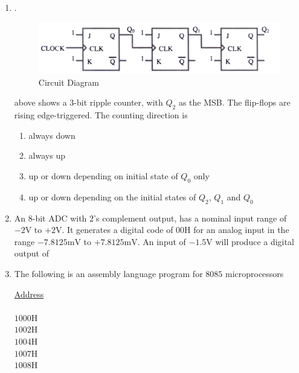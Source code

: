 \documentclass[journal,12pt,onecolumn]{IEEEtran}
\theoremstyle{remark}
\begin{document}
\begin{enumerate}
 

\item .
\begin{figure}[H]
    \centering
    \includegraphics[width=0.5\columnwidth]{Figs/Q-36.jpg}
    \caption{Circuit Diagram}
    \label{fig:placeholder_12}
\end{figure}
 above shows a $3$-bit ripple counter, with $Q_2$ as the MSB. The flip-flops are rising edge-triggered. The counting direction is \par  \hfill{}
    \begin{enumerate}
        \item always down
        \item always up
        \item up or down depending on initial state of $Q_0$ only
        \item up or down depending on the initial states of $Q_2$, $Q_1$ and $Q_0$ 
\end{enumerate}

 

\item An $8$-bit ADC with $2$'s complement output, has a nominal input range of $-2\text{V}$ to $+2$V. It generates a digital code of $00$H for an analog input in the range $-7.8125\text{mV}$ to $+7.8125\text{mV}$. An input of $-1.5\text{V}$ will produce a digital output of \par  \hfill{}
\begin{enumerate}
\end{enumerate} 

 

\item The following is an assembly language program for $8085$ microprocessors
\begin{multicols}{3}
    \underline{Address}\\\\
    $1000$H\\
    $1002$H\\
    $1004$H\\
    $1007$H\\
    $1008$H
    

\end{multicols}
\end{enumerate}
\end{document}

